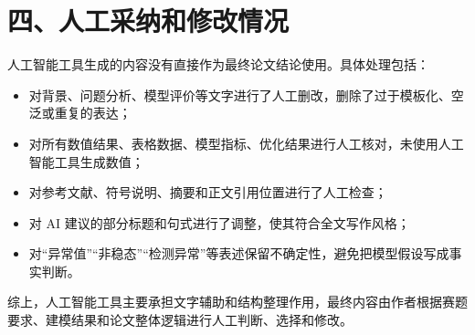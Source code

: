 \documentclass[UTF8,a4paper,zihao=-4]{ctexart}
\begin{document}
\section*{四、人工采纳和修改情况}

人工智能工具生成的内容没有直接作为最终论文结论使用。具体处理包括：

\begin{itemize}
  \item 对背景、问题分析、模型评价等文字进行了人工删改，删除了过于模板化、空泛或重复的表达；
  \item 对所有数值结果、表格数据、模型指标、优化结果进行人工核对，未使用人工智能工具生成数值；
  \item 对参考文献、符号说明、摘要和正文引用位置进行了人工检查；
  \item 对 AI 建议的部分标题和句式进行了调整，使其符合全文写作风格；
  \item 对“异常值”“非稳态”“检测异常”等表述保留不确定性，避免把模型假设写成事实判断。
\end{itemize}

综上，人工智能工具主要承担文字辅助和结构整理作用，最终内容由作者根据赛题要求、建模结果和论文整体逻辑进行人工判断、选择和修改。
\end{document}

